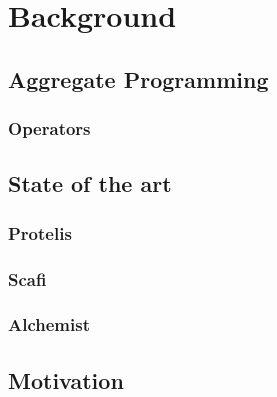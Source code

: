 \chapter{Background}\label{background}

\section{Aggregate Programming}
\subsection{Operators}

\section{State of the art}
\subsection{Protelis}
\subsection{Scafi}
\subsection{Alchemist}

\section{Motivation}